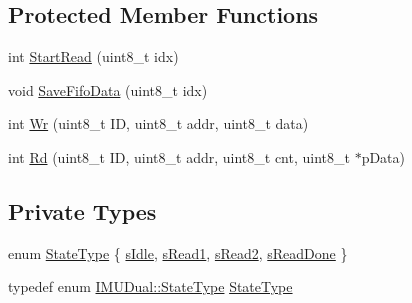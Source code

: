 \subsection*{Protected Member Functions}
\begin{DoxyCompactItemize}
\item 
int \hyperlink{class_i_m_u_dual_a928628c54fe67f896fa9834ecf5b987c}{StartRead} (uint8\_\-t idx)
\item 
void \hyperlink{class_i_m_u_dual_a09f6c845e4bb6d87ef434973eec21f92}{SaveFifoData} (uint8\_\-t idx)
\item 
int \hyperlink{class_i_m_u_dual_a41115fb579ed56da574cf8a3dea4cc48}{Wr} (uint8\_\-t ID, uint8\_\-t addr, uint8\_\-t data)
\item 
int \hyperlink{class_i_m_u_dual_aa9379ac87a98fad0dfba875b15d46342}{Rd} (uint8\_\-t ID, uint8\_\-t addr, uint8\_\-t cnt, uint8\_\-t $\ast$pData)
\end{DoxyCompactItemize}
\subsection*{Private Types}
\begin{DoxyCompactItemize}
\item 
enum \hyperlink{class_i_m_u_dual_a7378a5e321c03f3ef77e4f4f710f0130}{StateType} \{ \hyperlink{class_i_m_u_dual_a7378a5e321c03f3ef77e4f4f710f0130ae97f67f10b368c8def8f3d6d3af451e4}{sIdle}, 
\hyperlink{class_i_m_u_dual_a7378a5e321c03f3ef77e4f4f710f0130aac9c953c0f73be153d44739fec823482}{sRead1}, 
\hyperlink{class_i_m_u_dual_a7378a5e321c03f3ef77e4f4f710f0130a8c3de54a355ac16e3138c4affc319167}{sRead2}, 
\hyperlink{class_i_m_u_dual_a7378a5e321c03f3ef77e4f4f710f0130a6d6e56fa69cf9f745b252fc4d619f4d1}{sReadDone}
 \}
\item 
typedef enum \hyperlink{class_i_m_u_dual_a7378a5e321c03f3ef77e4f4f710f0130}{IMUDual::StateType} \hyperlink{class_i_m_u_dual_aab61cd505dbf9488df565a47e16575c2}{StateType}
\end{DoxyCompactItemize}
